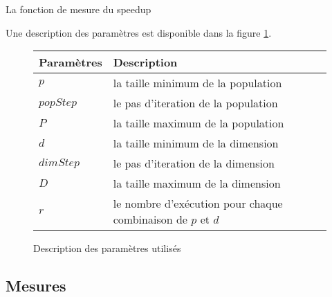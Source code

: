 \incmargin{1em}
\begin{algorithm}[here]
  \dontprintsemicolon
  \label{algo_speedup}
  \caption{La fonction de mesure du speedup}
\end{algorithm}
\decmargin{1em}

Une description des paramètres est disponible dans la figure \ref{fig:description_parametres}.

\begin{figure}[here]
  \centering
  \begin{tabular}{ | l | p{7cm} |}
    \hline
    \textbf{Paramètres} & \textbf{Description}\\\hline
    $p$ & la taille minimum de la population\\\hline
    $popStep$ & le pas d'iteration de la population\\\hline
    $P$ & la taille maximum de la population\\\hline
    $d$ & la taille minimum de la dimension\\\hline
    $dimStep$ & le pas d'iteration de la dimension\\\hline
    $D$ & la taille maximum de la dimension\\\hline
    $r$ & le nombre d'exécution pour chaque combinaison de $p$ et $d$\\\hline
  \end{tabular}
  \caption{Description des paramètres utilisés}
  \label{fig:description_parametres}
\end{figure}

\subsection{Mesures}

